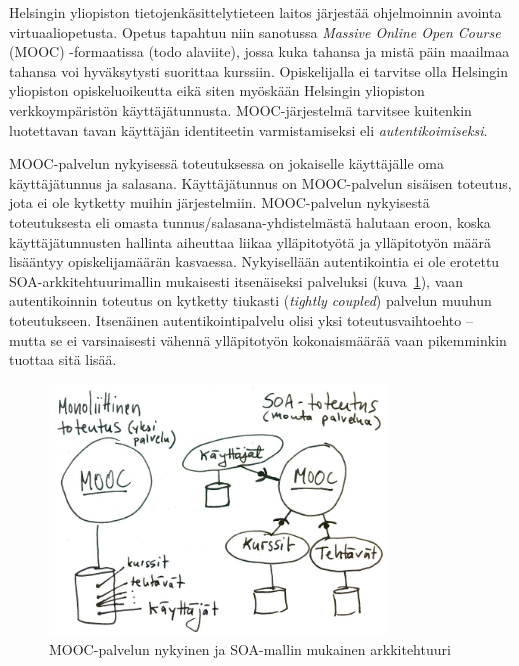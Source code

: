 \documentclass[finnish,gradu]{tktltiki}
\begin{document}
  Helsingin yliopiston tietojenkäsittelytieteen laitos järjestää ohjelmoinnin avointa virtuaaliopetusta. Opetus tapahtuu niin sanotussa \emph{Massive Online Open Course} (MOOC) -formaatissa (todo alaviite), jossa kuka tahansa ja mistä päin maailmaa tahansa voi hyväksytysti suorittaa kurssiin. Opiskelijalla ei tarvitse olla Helsingin yliopiston opiskeluoikeutta eikä siten myöskään Helsingin yliopiston verkkoympäristön käyttäjätunnusta. MOOC-järjestelmä tarvitsee kuitenkin luotettavan tavan käyttäjän identiteetin varmistamiseksi eli \emph{autentikoimiseksi}.

  MOOC-palvelun nykyisessä toteutuksessa on jokaiselle käyttäjälle oma käyttäjätunnus ja salasana. Käyttäjätunnus on MOOC-palvelun sisäisen toteutus, jota ei ole kytketty muihin järjestelmiin. MOOC-palvelun nykyisestä toteutuksesta eli omasta tunnus/salasana-yhdistelmästä halutaan eroon, koska käyttäjätunnusten hallinta aiheuttaa liikaa ylläpitotyötä ja ylläpitotyön määrä lisääntyy opiskelijamäärän kasvaessa. Nykyisellään autentikointia ei ole erotettu SOA-arkkitehtuurimallin mukaisesti itsenäiseksi palveluksi (kuva~\ref{fig:mooc-arkkitehtuuri}), vaan autentikoinnin toteutus on kytketty tiukasti (\emph{tightly coupled}) palvelun muuhun toteutukseen. Itsenäinen autentikointipalvelu olisi yksi toteutusvaihtoehto -- mutta se ei varsinaisesti vähennä ylläpitotyön kokonaismäärää vaan pikemminkin tuottaa sitä lisää.

  \begin{figure}[h!]
    \centering
    \includegraphics[width=0.8\textwidth]{images/mooc-arkkitehtuuri.jpg}
    \caption{MOOC-palvelun nykyinen ja SOA-mallin mukainen arkkitehtuuri}
    \label{fig:mooc-arkkitehtuuri}
  \end{figure}
\end{document}
